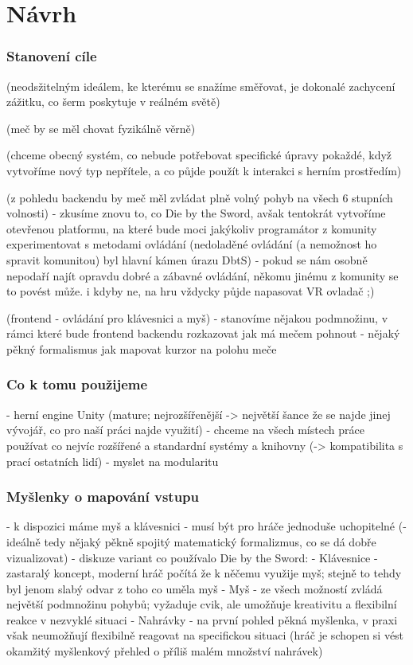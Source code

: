 \chapter{Návrh}

\subsection{Stanovení cíle}

(neodsžitelným ideálem, ke kterému se snažíme směřovat, je dokonalé zachycení zážitku, co šerm poskytuje v reálném světě)

(meč by se měl chovat fyzikálně věrně)

(chceme obecný systém, co nebude potřebovat specifické úpravy pokaždé, když vytvoříme nový typ nepřítele, a co půjde použít k interakci s herním prostředím)

(z pohledu backendu by meč měl zvládat plně volný pohyb na všech 6 stupních volnosti)
- zkusíme znovu to, co Die by the Sword, avšak tentokrát vytvoříme otevřenou platformu, na které bude moci jakýkoliv programátor z komunity experimentovat s metodami ovládání (nedoladěné ovládání (a nemožnost ho spravit komunitou) byl hlavní kámen úrazu DbtS)
    - pokud se nám osobně nepodaří najít opravdu dobré a zábavné ovládání, někomu jinému z komunity se to povést může. i kdyby ne, na hru vždycky půjde napasovat VR ovladač ;)

(frontend - ovládání pro klávesnici a myš)
- stanovíme nějakou podmnožinu, v rámci které bude frontend backendu rozkazovat jak má mečem pohnout
- nějaký pěkný formalismus jak mapovat kurzor na polohu meče


\subsection{Co k tomu použijeme}

- herní engine Unity (mature; nejrozšířenější -> největší šance že se najde jinej vývojář, co pro naší práci najde využití)
- chceme na všech místech práce používat co nejvíc rozšířené a standardní systémy a knihovny (-> kompatibilita s prací ostatních lidí)
- myslet na modularitu

\subsection{Myšlenky o mapování vstupu}
- k dispozici máme myš a klávesnici
- musí být pro hráče jednoduše uchopitelné (- ideálně tedy nějaký pěkně spojitý matematický formalizmus, co se dá dobře vizualizovat)
- diskuze variant co používalo Die by the Sword:
    - Klávesnice - zastaralý koncept, moderní hráč počítá že k něčemu využije myš; stejně to tehdy byl jenom slabý odvar z toho co uměla myš
    - Myš - ze všech možností zvládá největší podmnožinu pohybů; vyžaduje cvik, ale umožňuje kreativitu a flexibilní reakce v nezvyklé situaci
    - Nahrávky - na první pohled pěkná myšlenka, v praxi však neumožňují flexibilně reagovat na specifickou situaci (hráč je schopen si vést okamžitý myšlenkový přehled o příliš malém množství nahrávek)


